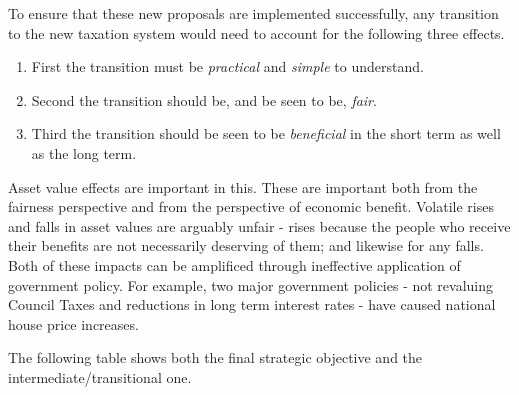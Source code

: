 \documentclass[]{tufte-handout}
\providecommand{\tightlist}{%
  \setlength{\itemsep}{0pt}\setlength{\parskip}{0pt}}
\begin{document}
To ensure that these new proposals are implemented successfully, any
transition to the new taxation system would need to account for the
following three effects.

\begin{enumerate}
\def\labelenumi{\arabic{enumi})}
\tightlist
\item
  First the transition must be \emph{practical} and \emph{simple} to
  understand.
\item
  Second the transition should be, and be seen to be, \emph{fair}.
\item
  Third the transition should be seen to be \emph{beneficial} in the
  short term as well as the long term.
\end{enumerate}

Asset value effects are important in this. These are important both from
the fairness perspective and from the perspective of economic benefit.
Volatile rises and falls in asset values are arguably unfair - rises
because the people who receive their benefits are not necessarily
deserving of them; and likewise for any falls. Both of these impacts can
be amplificed through ineffective application of government policy. For
example, two major government policies - not revaluing Council Taxes and
reductions in long term interest rates - have caused national house
price increases.

The following table shows both the final strategic objective and the
intermediate/transitional one.
\end{document}
